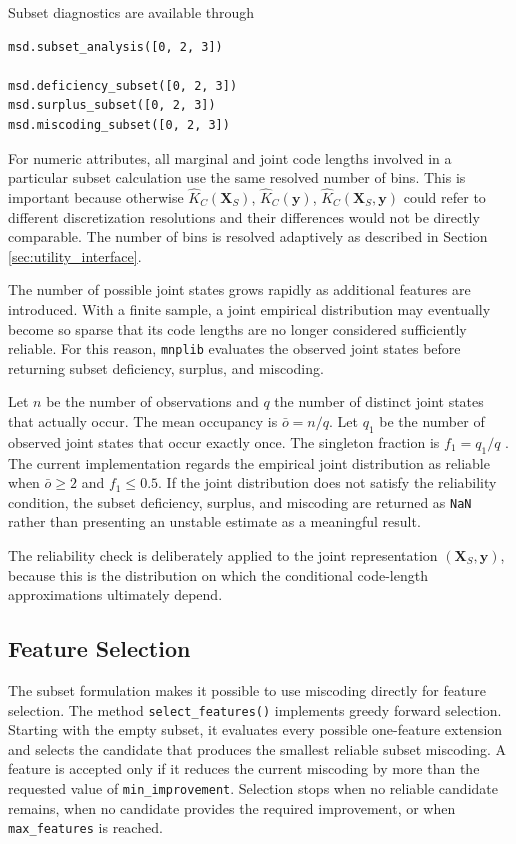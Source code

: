 Subset diagnostics are available through

\begin{sourcecode}
{\scriptsize \begin{verbatim}
msd.subset_analysis([0, 2, 3])

msd.deficiency_subset([0, 2, 3])
msd.surplus_subset([0, 2, 3])
msd.miscoding_subset([0, 2, 3])
\end{verbatim}}
\end{sourcecode}

For numeric attributes, all marginal and joint code lengths involved in a particular subset calculation use the same resolved number of bins. This is important because otherwise $\hat K_C(\mathbf{X}_S)$, $\hat K_C(\mathbf{y})$, $\hat K_C(\mathbf{X}_S,\mathbf{y})$ could refer to different discretization resolutions and their differences would not be directly comparable. The number of bins is resolved adaptively as described in Section \ref{sec:utility_interface}.

The number of possible joint states grows rapidly as additional features are introduced. With a finite sample, a joint empirical distribution may eventually become so sparse that its code lengths are no longer considered sufficiently reliable. For this reason, \texttt{mnplib} evaluates the observed joint states before returning subset deficiency, surplus, and miscoding.

Let $n$ be the number of observations and $q$ the number of distinct joint states that actually occur. The mean occupancy is $\bar o = n /q$. Let $q_1$ be the number of observed joint states that occur exactly once. The
singleton fraction is $f_1 = q_1 / q$ . The current implementation regards the empirical joint distribution as
reliable when $\bar o \geq 2$ and $f_1\leq 0.5$. If the joint distribution does not satisfy the reliability condition, the subset deficiency, surplus, and miscoding are returned as \texttt{NaN} rather than presenting an unstable estimate as a meaningful result.

The reliability check is deliberately applied to the joint representation $(\mathbf{X}_S,\mathbf{y})$, because this is the distribution on which the conditional code-length approximations ultimately depend.

\subsection*{Feature Selection}

The subset formulation makes it possible to use miscoding directly for feature selection. The method \texttt{select\_features()} implements greedy forward selection. Starting with the empty subset, it evaluates every possible one-feature extension and selects the candidate that produces the smallest reliable subset miscoding. A feature is accepted only if it reduces the current miscoding by more than the requested value of \texttt{min\_improvement}. Selection stops when no reliable candidate remains, when no candidate provides the required improvement, or when \texttt{max\_features} is reached.

